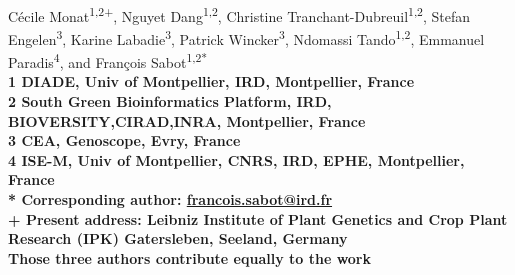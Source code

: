 \documentclass[10pt,letterpaper]{article}
\begin{document}
\vspace*{0.35in}

\begin{flushleft}
{\Large
\textbf{}
}
\newline
\\
Cécile Monat\textsuperscript{1,2{+}\textdagger},
Nguyet Dang\textsuperscript{1,2\textdagger},
Christine Tranchant-Dubreuil\textsuperscript{1,2\textdagger},
Stefan Engelen\textsuperscript{3},
Karine Labadie\textsuperscript{3},
Patrick Wincker\textsuperscript{3},
Ndomassi Tando\textsuperscript{1,2},
Emmanuel Paradis\textsuperscript{4},
and François Sabot\textsuperscript{1,2*}
\\
\bigskip
\bf{1} DIADE, Univ of Montpellier, IRD, Montpellier, France
\\
\bf{2} South Green Bioinformatics Platform, IRD, BIOVERSITY,CIRAD,INRA, Montpellier, France
\\
\bf{3} CEA, Genoscope, Evry, France
\\
\bf{4} ISE-M, Univ of Montpellier, CNRS, IRD, EPHE, Montpellier, France
\\
\bigskip
* Corresponding author: \url{francois.sabot@ird.fr}\\
{+} Present address: Leibniz Institute of Plant Genetics and Crop Plant Research (IPK) Gatersleben, Seeland, Germany\\
\textdagger Those three authors contribute equally to the work\\
\end{flushleft}
\end{document}
